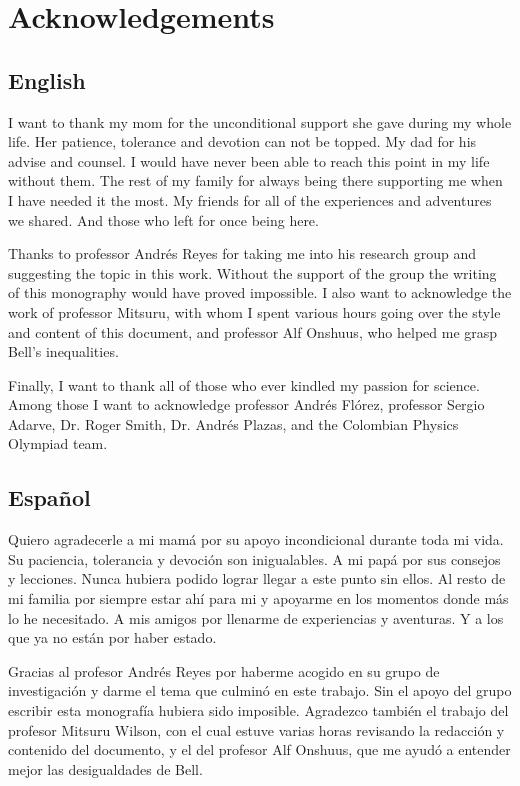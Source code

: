\documentclass[12pt]{report}
\theoremstyle{definition}
\begin{document}
\chapter*{Acknowledgements}

\section*{English}

I want to thank my mom for the unconditional support she gave during my whole life. Her patience, tolerance and devotion can not be topped. My dad for his advise and counsel. I would have never been able to reach this point in my life without them. The rest of my family for always being there supporting me when I have needed it the most. My friends for all of the experiences and adventures we shared. And those who left for once being here.

Thanks to professor Andrés Reyes for taking me into his research group and suggesting the topic in this work. Without the support of the group the writing of this monography would have proved impossible. I also want to acknowledge the work of professor Mitsuru, with whom I spent various hours going over the style and content of this document, and professor Alf Onshuus, who helped me grasp Bell's inequalities.

Finally, I want to thank all of those who ever kindled my passion for science. Among those I want to acknowledge professor Andrés Flórez, professor Sergio Adarve, Dr. Roger Smith, Dr. Andrés Plazas, and the Colombian Physics Olympiad team. 

\section*{Español}

Quiero agradecerle a mi mamá por su apoyo incondicional durante toda mi vida. Su paciencia, tolerancia y devoción son inigualables. A mi papá por sus consejos y lecciones. Nunca hubiera podido lograr llegar a este punto sin ellos. Al resto de mi familia por siempre estar ahí para mi y apoyarme en los momentos donde más lo he necesitado. A mis amigos por llenarme de experiencias y aventuras. Y a los que ya no están por haber estado.

Gracias al profesor Andrés Reyes por haberme acogido en su grupo de investigación y darme el tema que culminó en este trabajo. Sin el apoyo del grupo escribir esta monografía hubiera sido imposible. Agradezco también el trabajo del profesor Mitsuru Wilson, con el cual estuve varias horas revisando la redacción y contenido del documento, y el del profesor Alf Onshuus, que me ayudó a entender mejor las desigualdades de Bell.
\end{document}
